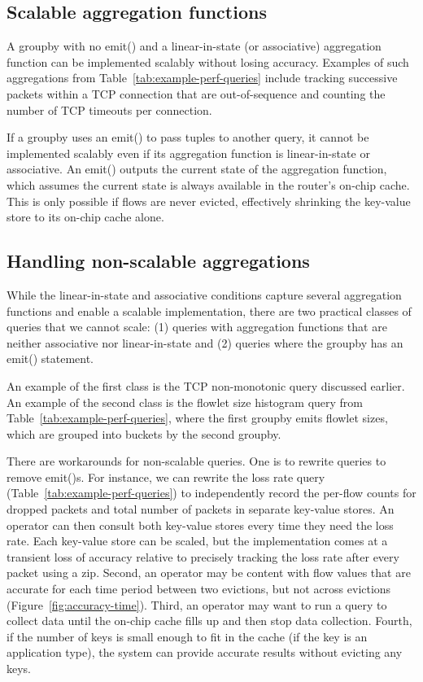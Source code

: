 \subsection{Scalable aggregation functions}
\label{sec:scalable}
A {\ct groupby} with no {\ct emit()} and a linear-in-state (or associative)
aggregation function can be implemented scalably without losing accuracy.
Examples of such aggregations from Table~\ref{tab:example-perf-queries}
include tracking successive packets within a TCP connection that are
out-of-sequence and counting the number of TCP timeouts per connection.

 If a {\ct groupby} uses an {\ct emit()} to pass tuples to another query, it
cannot be implemented scalably even if its aggregation function is
linear-in-state or associative. An {\ct emit()} outputs the current state of
the aggregation function, which assumes the current state is always available
in the router's on-chip cache. This is only possible if flows are never
evicted, effectively shrinking the key-value store to its on-chip cache alone.

\subsection{Handling non-scalable aggregations}
\label{sec:workaround-nonscalable}
While the linear-in-state and associative conditions capture several
aggregation functions and enable a scalable implementation, there are two
practical classes of queries that we cannot scale: (1) queries with aggregation
functions that are neither associative nor linear-in-state and (2) queries
where the groupby has an {\ct emit()} statement.

An example of the first class is the TCP non-monotonic query discussed earlier.
An example of the second class is the flowlet size histogram query from
Table~\ref{tab:example-perf-queries}, where the first {\ct groupby} emits
flowlet sizes, which are grouped into buckets by the second {\ct groupby}.

There are workarounds for non-scalable queries. One is to rewrite queries to
remove {\ct emit()}s.  For instance, we can rewrite the loss rate query
(Table~\ref{tab:example-perf-queries}) to independently record the per-flow
counts for dropped packets and total number of packets in separate key-value
stores. An operator can then consult both key-value stores every time they need
the loss rate. Each key-value store can be scaled, but the implementation comes
at a transient loss of accuracy relative to precisely tracking the loss rate
after every packet using a {\ct zip.} Second, an operator may be content with
flow values that are accurate for each time period between two evictions, but
not across evictions (Figure~\ref{fig:accuracy-time}). Third, an operator may
want to run a query to collect data until the on-chip cache fills up and then
stop data collection.  Fourth, if the number of keys is small enough to fit in
the cache (\eg if the key is an application type), the system can provide
accurate results without evicting any keys.

